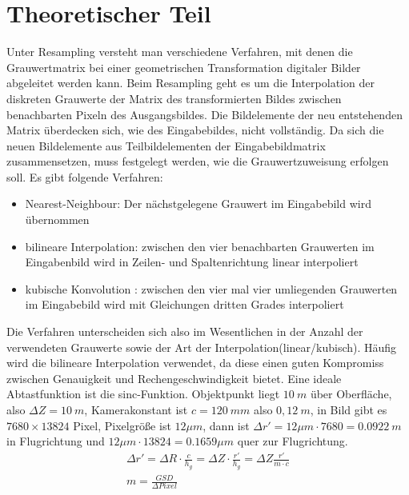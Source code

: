 \documentclass[12pt]{article}
\begin{document}
	\pagestyle{main}
\tableofcontents
\newpage
\section{Theoretischer Teil}
Unter Resampling versteht man verschiedene Verfahren, mit denen die Grauwertmatrix bei einer geometrischen Transformation digitaler Bilder abgeleitet werden kann. Beim Resampling geht es um die Interpolation der diskreten Grauwerte der Matrix des transformierten Bildes zwischen benachbarten Pixeln des Ausgangsbildes. Die Bildelemente der neu entstehenden Matrix überdecken sich, wie des Eingabebildes, nicht vollständig. Da sich die neuen Bildelemente aus Teilbildelementen der Eingabebildmatrix zusammensetzen, muss festgelegt werden, wie die Grauwertzuweisung erfolgen soll. \newline
\newline
Es gibt folgende Verfahren:
\begin{itemize}
\item Nearest-Neighbour: Der nächstgelegene Grauwert im Eingabebild wird übernommen 
\item bilineare Interpolation: zwischen den vier benachbarten Grauwerten im Eingabenbild wird in Zeilen- und Spaltenrichtung linear interpoliert 
\item kubische Konvolution : zwischen den vier mal vier umliegenden Grauwerten im Eingabebild wird mit Gleichungen dritten Grades interpoliert 
\end{itemize}
Die Verfahren unterscheiden sich also im Wesentlichen in der Anzahl der verwendeten Grauwerte sowie der Art der Interpolation(linear/kubisch). Häufig wird die bilineare Interpolation verwendet, da diese einen guten Kompromiss zwischen Genauigkeit und Rechengeschwindigkeit bietet. Eine ideale Abtastfunktion ist die sinc-Funktion. \newline
\newline
Objektpunkt liegt $10\ m$ über Oberfläche, also $\Delta Z = 10\ m$,  Kamerakonstant ist $c = 120\ mm$ also $0,12\ m$,  in Bild gibt es $7680 \times 13824$ Pixel, Pixelgröße ist $12 \mu m$, dann ist $\Delta r' = 12 \mu m \cdot 7680 = 0.0922\ m$ in Flugrichtung und $12 \mu m \cdot 13824 = 0.1659 \mu m $ quer zur Flugrichtung. 
\begin{gather*}
\Delta r' = \Delta R \cdot \frac{c}{h_g} = \Delta Z \cdot \frac{r'}{h_g} = \Delta Z \frac{r'}{m \cdot c} \\
m = \frac{GSD}{\Delta Pixel}
\end{gather*}
\end{document}
